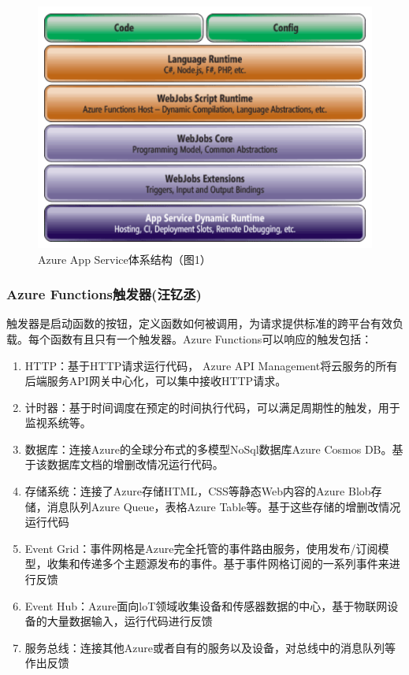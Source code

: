 \documentclass[11pt]{article}
\begin{document}
\begin{figure}[!htbp]
	\centering
	\includegraphics[scale=0.5]{figs/AzureArchitecture.PNG}
	\caption{Azure App Service体系结构（\cite{archi}图1）}
	\label{figs:architecture}
\end{figure}

\subsubsection{Azure Functions触发器(汪钇丞)}
触发器是启动函数的按钮，定义函数如何被调用，为请求提供标准的跨平台有效负载。每个函数有且只有一个触发器。Azure Functions可以响应的触发包括：
\begin{enumerate}
	\item HTTP：基于HTTP请求运行代码， Azure API Management将云服务的所有后端服务API网关中心化，可以集中接收HTTP请求。
	\item 计时器：基于时间调度在预定的时间执行代码，可以满足周期性的触发，用于监视系统等。
	\item 数据库：连接Azure的全球分布式的多模型NoSql数据库Azure Cosmos DB。基于该数据库文档的增删改情况运行代码。
	\item 存储系统：连接了Azure存储HTML，CSS等静态Web内容的Azure Blob存储，消息队列Azure Queue，表格Azure Table等。基于这些存储的增删改情况运行代码
	\item Event Grid：事件网格是Azure完全托管的事件路由服务，使用发布/订阅模型，收集和传递多个主题源发布的事件。基于事件网格订阅的一系列事件来进行反馈
	\item Event Hub：Azure面向loT领域收集设备和传感器数据的中心，基于物联网设备的大量数据输入，运行代码进行反馈
	\item 服务总线：连接其他Azure或者自有的服务以及设备，对总线中的消息队列等作出反馈
\end{enumerate}
\end{document}
